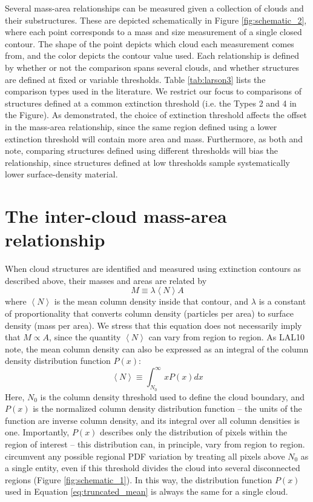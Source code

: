 Several mass-area relationships can be measured given a collection of clouds and their substructures. These are depicted schematically in Figure \ref{fig:schematic_2}, where each point corresponds to a mass and size measurement of a single closed contour. The shape of the point depicts which cloud each measurement comes from, and the color depicts the contour value used. Each relationship is defined by whether or not the comparison spans several clouds, and whether structures are defined at fixed or variable thresholds. Table \ref{tab:larson3} lists the comparison types used in the literature. We restrict our focus to comparisons of structures defined at a common extinction threshold (i.e. the Types 2 and 4 in the Figure). As \cite{Lombardi10} demonstrated, the choice of extinction threshold affects the offset in the mass-area relationship, since the same region defined using a lower extinction threshold will contain more area and mass. Furthermore, as both \cite{Lombardi10} and \cite{Kauffmann10a} note, comparing structures defined using different thresholds will bias the relationship, since structures defined at low thresholds sample systematically lower surface-density material.

\section{The inter-cloud mass-area relationship}
\label{sec:inter}
When cloud structures are identified and measured using extinction contours as described above, their masses and areas are related by
\begin{equation}
M \equiv \lambda \left<N\right> A
\label{eq:mna}
\end{equation}
where $\left<N\right>$ is the mean column density inside that contour, and $\lambda$ is a constant of proportionality that converts column density (particles per area) to surface density (mass per area). We stress that this equation does not necessarily imply that $M \propto A$, since the quantity $\left<N\right>$ can vary from region to region. As LAL10 note, the mean column density can also be expressed as an integral of the column density distribution function $P(x)$:
\begin{equation}
\left<N\right> \equiv \int_{N_0}^\infty x P(x) dx
\label{eq:truncated_mean}
\end{equation}
Here, $N_0$ is the column density threshold used to define the cloud boundary, and $P(x)$ is the normalized column density distribution function -- the units of the function are inverse column density, and its integral over all column densities is one. Importantly, $P(x)$ describes only the distribution of pixels within the region of interest -- this distribution can, in principle, vary from region to region. \cite{Lombardi10} circumvent any possible regional PDF variation by treating all pixels above $N_0$ as a single entity, even if this threshold divides the cloud into several disconnected regions (Figure \ref{fig:schematic_1}). In this way, the distribution function $P(x)$ used in Equation \ref{eq:truncated_mean} is always the same for a single cloud.

